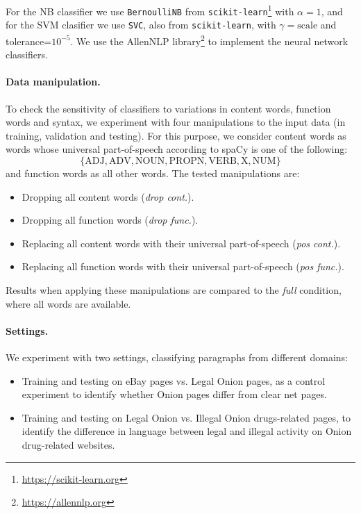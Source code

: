 \documentclass[11pt,a4paper,table]{article}
\begin{document}
For the NB classifier we use \texttt{BernoulliNB} from
\texttt{scikit-learn}\footnote{\url{https://scikit-learn.org}}
with $\alpha=1$,
and for the SVM clasifier we use \texttt{SVC}, also from \texttt{scikit-learn},
with $\gamma=\mathrm{scale}$ and tolerance=$10^{-5}$.
We use the AllenNLP  library\footnote{\url{https://allennlp.org}}
\cite{Gardner2017AllenNLP} to implement the neural network classifiers.

\paragraph{Data manipulation.}

To check the sensitivity of classifiers to variations in content words,
function words and syntax, we experiment with four manipulations to the input
data (in training, validation and testing).
For this purpose, we consider content words as words whose universal part-of-speech
according to spaCy is one of the following:
\[\{\mathrm{ADJ, ADV, NOUN, PROPN, VERB, X, NUM}\}\]
and function words as all other words.
The tested manipulations are:

\begin{itemize}
  \item Dropping all content words ({\it drop cont.}).
  \item Dropping all function words ({\it drop func.}).
  \item Replacing all content words with their universal part-of-speech ({\it pos cont.}).
  \item Replacing all function words with their universal part-of-speech ({\it pos func.}).
\end{itemize}

Results when applying these manipulations are compared to the {\it full} condition, where all
words are available.

\paragraph{Settings.}

We experiment with two settings, classifying paragraphs from different domains:
\begin{itemize}
  \item Training and testing on eBay pages vs. Legal Onion pages,
  as a control experiment
  to identify whether Onion pages differ from clear net pages.
  \item Training and testing on Legal Onion vs. Illegal Onion drugs-related pages,
  to identify the difference in language between legal and illegal activity
  on Onion drug-related websites.
  
\end{itemize}
\end{document}

